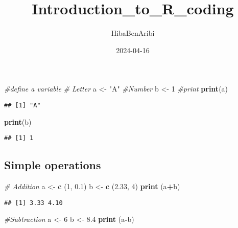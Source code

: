\documentclass[
]{article}
\title{Introduction\_to\_R\_coding}
\author{HibaBenAribi}
\date{2024-04-16}
\newenvironment{Shaded}{\begin{snugshade}}{\end{snugshade}}
\newcommand{\CommentTok}[1]{\textcolor[rgb]{0.56,0.35,0.01}{\textit{#1}}}
\newcommand{\DecValTok}[1]{\textcolor[rgb]{0.00,0.00,0.81}{#1}}
\newcommand{\FloatTok}[1]{\textcolor[rgb]{0.00,0.00,0.81}{#1}}
\newcommand{\FunctionTok}[1]{\textcolor[rgb]{0.13,0.29,0.53}{\textbf{#1}}}
\newcommand{\NormalTok}[1]{#1}
\newcommand{\OtherTok}[1]{\textcolor[rgb]{0.56,0.35,0.01}{#1}}
\newcommand{\SpecialCharTok}[1]{\textcolor[rgb]{0.81,0.36,0.00}{\textbf{#1}}}
\newcommand{\StringTok}[1]{\textcolor[rgb]{0.31,0.60,0.02}{#1}}
\begin{document}
\maketitle

\begin{Shaded}
\begin{Highlighting}[]
\CommentTok{\#define a variable}
 \CommentTok{\# Letter}
\NormalTok{a }\OtherTok{\textless{}{-}} \StringTok{"A"}
\CommentTok{\#Number }
\NormalTok{b }\OtherTok{\textless{}{-}} \DecValTok{1} 
\CommentTok{\#print}
\FunctionTok{print}\NormalTok{(a)}
\end{Highlighting}
\end{Shaded}

\begin{verbatim}
## [1] "A"
\end{verbatim}

\begin{Shaded}
\begin{Highlighting}[]
\FunctionTok{print}\NormalTok{(b)}
\end{Highlighting}
\end{Shaded}

\begin{verbatim}
## [1] 1
\end{verbatim}

\hypertarget{simple-operations}{%
\subsection{Simple operations}\label{simple-operations}}

\begin{Shaded}
\begin{Highlighting}[]
\CommentTok{\# Addition}
\NormalTok{a }\OtherTok{\textless{}{-}} \FunctionTok{c}\NormalTok{ (}\DecValTok{1}\NormalTok{, }\FloatTok{0.1}\NormalTok{)}
\NormalTok{b }\OtherTok{\textless{}{-}} \FunctionTok{c}\NormalTok{ (}\FloatTok{2.33}\NormalTok{, }\DecValTok{4}\NormalTok{)}
\FunctionTok{print}\NormalTok{ (a}\SpecialCharTok{+}\NormalTok{b)}
\end{Highlighting}
\end{Shaded}

\begin{verbatim}
## [1] 3.33 4.10
\end{verbatim}

\begin{Shaded}
\begin{Highlighting}[]
\CommentTok{\#Subtraction }
\NormalTok{ a }\OtherTok{\textless{}{-}} \DecValTok{6}
\NormalTok{ b }\OtherTok{\textless{}{-}} \FloatTok{8.4}
 \FunctionTok{print}\NormalTok{ (a}\SpecialCharTok{{-}}\NormalTok{b)}
\end{Highlighting}
\end{Shaded}
\end{document}
